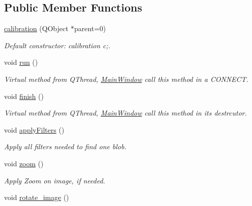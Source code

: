 \subsection*{Public Member Functions}
\begin{DoxyCompactItemize}
\item 
\hyperlink{classcalibration_ad32a2ff0e4e27bd28ac06d7dda8b5853}{calibration} (Q\+Object $\ast$parent=0)
\begin{DoxyCompactList}\small\item\em Default constructor\+: calibration c;. \end{DoxyCompactList}\item 
void \hyperlink{classcalibration_a4b435b278f024e919b733627884ba0d2}{run} ()
\begin{DoxyCompactList}\small\item\em Virtual method from Q\+Thread, \hyperlink{classMainWindow}{Main\+Window} call this method in a C\+O\+N\+N\+E\+CT. \end{DoxyCompactList}\item 
void \hyperlink{classcalibration_a01c20860fb99a2370c191b0228e82af4}{finish} ()\hypertarget{classcalibration_a01c20860fb99a2370c191b0228e82af4}{}\label{classcalibration_a01c20860fb99a2370c191b0228e82af4}

\begin{DoxyCompactList}\small\item\em Virtual method from Q\+Thread, \hyperlink{classMainWindow}{Main\+Window} call this method in its destrcutor. \end{DoxyCompactList}\item 
void \hyperlink{classcalibration_a17edbce9454069eaa50cc84aa1cb34fd}{apply\+Filters} ()
\begin{DoxyCompactList}\small\item\em Apply all filters needed to find one blob. \end{DoxyCompactList}\item 
void \hyperlink{classcalibration_af2cc271619bd9d5c0e72ebbbf1b83f39}{zoom} ()
\begin{DoxyCompactList}\small\item\em Apply Zoom on image, if needed. \end{DoxyCompactList}\item 
void \hyperlink{classcalibration_a8beddb2a9ce3bef4dda101ea1f3f690c}{rotate\+\_\+image} ()\hypertarget{classcalibration_a8beddb2a9ce3bef4dda101ea1f3f690c}{}\label{classcalibration_a8beddb2a9ce3bef4dda101ea1f3f690c}


\end{DoxyCompactItemize}
